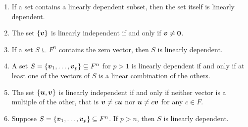\begin{Thm}\label{prop:indTest1}\mbox{}
\begin{enumerate}
\item If a set contains a linearly dependent subset, then the set itself is linearly dependent.\\
\item The set $\{\boldsymbol v\}$ is linearly independent if and only if $\boldsymbol v \neq \boldsymbol 0$.\\
\item If a set $S \subseteq F^n$ contains the zero vector, then $S$ is linearly dependent.\\
\item A set $S = \{\boldsymbol v_1, \ldots, \boldsymbol v_p\}\subseteq F^n$  for $p>1$ is linearly dependent if and only if at least one of the vectors of $S$ is a linear combination of the others.\\
\item The set $\{\boldsymbol u, \boldsymbol v\}$ is linearly independent if and only if neither vector is a multiple of the other, that is $\boldsymbol v \neq c\boldsymbol u$ nor $\boldsymbol u \neq c\boldsymbol v$ for any $c\in F$.\\
\item Suppose $S = \{\boldsymbol v_1, \ldots, \boldsymbol v_p\} \subseteq F^n$. If $p > n$, then $S$ is linearly dependent.\\
\end{enumerate}
\end{Thm}
